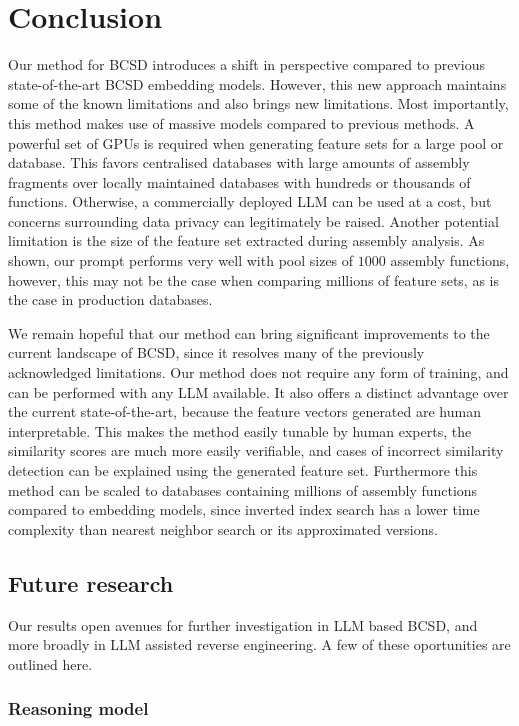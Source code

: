 \section{Conclusion}

Our method for BCSD introduces a shift in perspective compared to previous state-of-the-art BCSD embedding models. However,
this new approach maintains some of the known limitations and also brings new limitations. Most importantly, this
method makes use of massive models compared to previous methods. A powerful set of GPUs is required when generating
feature sets for a large pool or database. This favors centralised databases with large amounts of assembly fragments over
locally maintained databases with hundreds or thousands of functions. Otherwise, a commercially deployed LLM can be used at a
cost, but concerns surrounding data privacy can legitimately be raised. Another potential limitation is the size of the feature
set extracted during assembly analysis. As shown, our prompt performs very well with pool sizes of \(1000\) assembly functions,
however, this may not be the case when comparing millions of feature sets, as is the case in production databases.

We remain hopeful that our method can bring significant improvements to the current landscape of BCSD, since it resolves
many of the previously acknowledged limitations. Our method does not require any form of training, and can be performed with any LLM
available. It also offers a distinct advantage over the current state-of-the-art, because the feature vectors generated are human
interpretable. This makes the method easily tunable by human experts, the similarity scores are much more easily verifiable, and
cases of incorrect similarity detection can be explained using the generated feature set. Furthermore this method can be scaled to
databases containing millions of assembly functions compared to embedding models, since inverted index search has a lower time
complexity than nearest neighbor search or its approximated versions.

\subsection{Future research}

Our results open avenues for further investigation in LLM based BCSD, and more broadly in LLM assisted reverse engineering.
A few of these oportunities are outlined here.

\subsubsection{Reasoning model}

